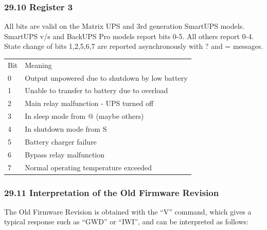 {{{{{{{{{{{{{{{{{\begin{longtable}{p{0.3in}p{4.7in}}
\end{longtable}

\label{Register-3}

\subsubsection*{29.10 Register 3}

All bits are valid on the Matrix UPS and 3rd generation SmartUPS models.
SmartUPS v/s and BackUPS Pro models report bits 0-5. All others report 0-4.
State change of bits 1,2,5,6,7 are reported asynchronously with ? and =
messages.  

\begin{longtable}{p{0.3in}p{4.7in}}
{Bit} & {Meaning 
 } \\
{0} & {Output unpowered due to shutdown by low battery 
 } \\
{1} & {Unable to transfer to battery due to overload 
 } \\
{2} & {Main relay malfunction - UPS turned off 
 } \\
{3} & {In sleep mode from @ (maybe others) 
 } \\
{4} & {In shutdown mode from S 
 } \\
{5} & {Battery charger failure 
 } \\
{6} & {Bypass relay malfunction 
 } \\
{7} & {Normal operating temperature exceeded  
}

\end{longtable}

\label{Interpretation-of-the-Old-Firmware-Revision}

\subsubsection*{29.11 Interpretation of the Old Firmware Revision}

The Old Firmware Revision is obtained with the ``V'' command, which gives a
typical response such as ``GWD'' or ``IWI'', and can be interpreted as
follows: 

\footnotesize
\begin{verbatim}
     

\end{verbatim}}}}}}}}}}}}}}}}}}
